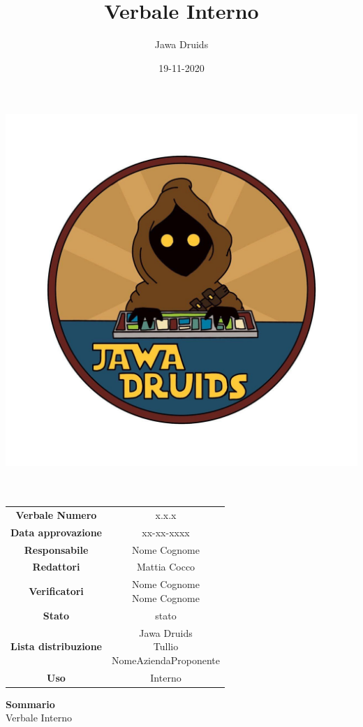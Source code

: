 \documentclass[a4paper,12pt]{report}
\begin{document}
	
	\makeatletter
	\begin{titlepage}
		\begin{center}
			\vspace*{-4,0cm}
			\author{Jawa Druids} 
			\title{Verbale Interno}
			\date{19-11-2020} %
			\includegraphics[width=0.7\linewidth]{../../immagini/DRUIDSLOGO.jpg}\\[4ex]
			{\huge \bfseries  \@title }\\[2ex] 
			{\LARGE  \@author}\\[50ex]
			\vspace*{-8,0cm}
			\begin{table}[H]
				\centering
				\begin{tabular}{c|c}
					\textbf{Verbale Numero} & x.x.x \\
					\textbf{Data approvazione} & xx-xx-xxxx\\
					\textbf{Responsabile} & Nome Cognome\\
					\textbf{Redattori} & Mattia Cocco \\
					\textbf{Verificatori} & \makecell{Nome Cognome \\ Nome Cognome} \\
					\textbf{Stato} & stato\\
					\textbf{Lista distribuzione} & \makecell{Jawa Druids \\ Tullio \\ NomeAziendaProponente}\\
					\textbf{Uso} & Interno            
				\end{tabular}
			\end{table}
			\fontsize{16}{10}\textbf{Sommario} \\
			Verbale Interno			
		\end{center}
	\end{titlepage}
\end{document}

